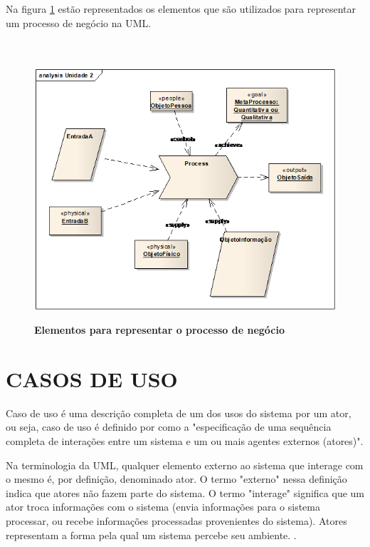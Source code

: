 \documentclass[
	12pt,				%
	openright,			%
	oneside,			%
	a4paper,			%
	chapter=TITLE,		%
	section=TITLE,		%
	english,			%
	french,				%
	spanish,			%
	brazil				%
	]{abntex2}
\begin{document}
Na figura \ref{fig-macroprocesso} estão representados os elementos que são utilizados para representar um processo de negócio na UML.
\\ \\ \\

\begin{figure}[htb]
	\begin{center}
		\caption{
			\textbf{Elementos para representar o processo de negócio}
		}\label{fig-macroprocesso}
		\includegraphics [scale=0.6]{imagens/macroprocesso.png}
		\label{fig-macroprocesso}
	\end{center}
\end{figure}


\section{CASOS DE USO}
Caso de uso é uma descrição completa de um dos usos do sistema por um ator, ou seja, caso de uso é definido por  como a "especificação de uma sequência completa de interações entre um sistema e um ou mais agentes externos (atores)".

\begin{citacao}
Na terminologia da UML, qualquer elemento externo ao sistema que interage com o mesmo é, por definição, denominado ator. O termo "externo" nessa definição indica que atores não fazem parte do sistema. O termo "interage" significa que um ator troca informações com o sistema (envia informações para o sistema processar, ou recebe informações processadas provenientes do sistema). Atores representam a forma pela qual um sistema percebe seu ambiente. \cite[p. 60]{bezerraUML}.
\end{citacao}
\end{document}
